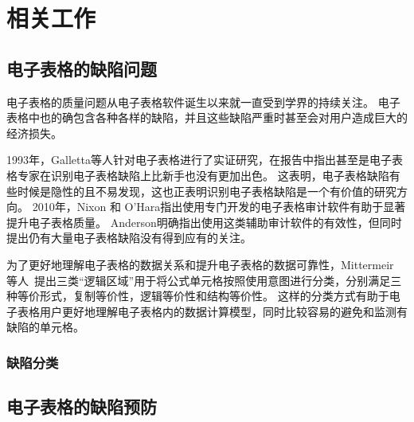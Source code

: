 \chapter{相关工作}

\section{电子表格的缺陷问题}

电子表格的质量问题从电子表格软件诞生以来就一直受到学界的持续关注。
电子表格中也的确包含各种各样的缺陷\cite{powell2008critical,rajalingham2008classification,panko2006facing,panko2008spreadsheet}，并且这些缺陷严重时甚至会对用户造成巨大的经济损失\cite{reinhart2010growth,panko2016we}。

1993年，Galletta等人\cite{galletta1993empirical}针对电子表格进行了实证研究，在报告中指出甚至是电子表格专家在识别电子表格缺陷上比新手也没有更加出色。
这表明，电子表格缺陷有些时候是隐性的且不易发现，这也正表明识别电子表格缺陷是一个有价值的研究方向。
2010年，Nixon 和 O'Hara\cite{nixon2010spreadsheet}指出使用专门开发的电子表格审计软件有助于显著提升电子表格质量。
Anderson\cite{anderson2004comparison}明确指出使用这类辅助审计软件的有效性，但同时提出仍有大量电子表格缺陷没有得到应有的关注。

为了更好地理解电子表格的数据关系和提升电子表格的数据可靠性，Mittermeir 等人~\cite{clermont2003auditing,mittermeir2002finding}提出三类“逻辑区域”用于将公式单元格按照使用意图进行分类，分别满足三种等价形式，复制等价性，逻辑等价性和结构等价性。
这样的分类方式有助于电子表格用户更好地理解电子表格内的数据计算模型，同时比较容易的避免和监测有缺陷的单元格。

\subsection{缺陷分类}




\section{电子表格的缺陷预防}



